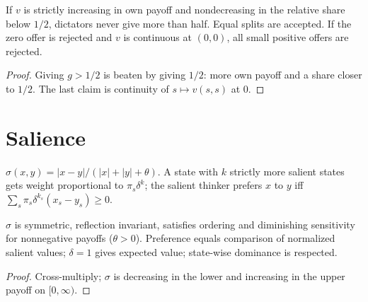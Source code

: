 \begin{theorem}
\label{thm:beh-erc}
\leanok
{}
If $v$ is strictly increasing in own payoff and nondecreasing in the relative share below $1/2$, dictators never give
more than half. Equal splits are accepted. If the zero offer is rejected and $v$ is continuous at $(0,0)$, all small
positive offers are rejected.
\end{theorem}
\begin{proof}
\leanok
Giving $g>1/2$ is beaten by giving $1/2$: more own payoff and a share closer to $1/2$. The last claim is continuity
of $s\mapsto v(s,s)$ at $0$.
\end{proof}

\section{Salience}
\label{sec:beh-salience}

\begin{definition}
\label{def:beh-salience}
\leanok
$\sigma(x,y)=|x-y|/(|x|+|y|+\theta)$. A state with $k$ strictly more salient states gets weight proportional to
$\pi_s\delta^k$; the salient thinker prefers $x$ to $y$ iff $\sum_s\pi_s\delta^{k_s}(x_s-y_s)\ge0$.
\end{definition}

\begin{theorem}
\label{thm:beh-salience-props}
\leanok
{}
$\sigma$ is symmetric, reflection invariant, satisfies ordering and diminishing sensitivity for nonnegative payoffs
($\theta>0$). Preference equals comparison of normalized salient values; $\delta=1$ gives expected value; state-wise
dominance is respected.
\end{theorem}
\begin{proof}
\leanok
Cross-multiply; $\sigma$ is decreasing in the lower and increasing in the upper payoff on $[0,\infty)$.
\end{proof}

